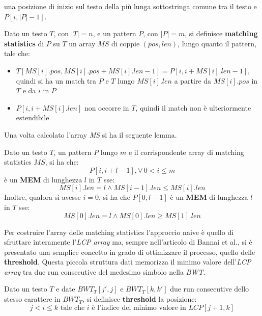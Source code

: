 una posizione di inizio sul testo della più lunga sottostringa comune tra il
testo e $P[i, |P|-1]$. 
\begin{definizione}
  Dato un testo $T$, con $|T|=n$, e un pattern $P$, con $|P|=m$, si definisce
  \textbf{matching statistics} di $P$ su $T$ un array $MS$ di coppie $(pos,
  len)$, lungo quanto il pattern, tale che:
  \begin{itemize}
    \item $T[MS[i].pos,MS[i].pos+MS[i].len-1]=P[i,i+MS[i].len-1]$, quindi si ha
    un match tra $P$ e $T$ lungo $MS[i].len$ a partire da $MS[i].pos$ in $T$ e
    da $i$ in $P$
    \item $P[i,i+MS[i].len]$ non occorre in $T$, quindi il match non è
    ulteriormente estendibile 
  \end{itemize}
\end{definizione}
\noindent
Una volta calcolato l'array \textit{MS} si ha il seguente lemma.
\begin{lemma}
  Dato un testo $T$, un pattern $P$ lungo $m$ e il
  corrispondente array di matching statistics $MS$, si ha che:
  \begin{equation}
    \label{eq:rlbwt5}
    P[i,i+l-1],\forall\, 0<i\leq m
  \end{equation}
  è un \textbf{MEM} di lunghezza $l$ in $T$ sse:
  \begin{equation}
    \label{eq:rlbwt6}
    MS[i].len=l\land MS[i-1].len\leq MS[i].len
  \end{equation}
  Inoltre, qualora si avesse $i=0$, si ha che $P[0,l-1]$ è un \textbf{MEM} di
  lunghezza $l$ in $T$ sse:
  \begin{equation}
    \label{eq:rlbwt7}
    MS[0].len=l\land MS[0].len\geq MS[1].len
  \end{equation}
\end{lemma}
Per costruire l'array delle matching statistics l'approccio naive è quello di
sfruttare 
interamente l'\textit{LCP array} ma, sempre nell'articolo di Bannai et
al.\cite{bannai}, si è presentato una semplice concetto in grado di
ottimizzare il processo, quello delle \textbf{threshold}. Questa piccola
struttura dati memorizza il minimo valore dell'\textit{LCP array} tra due run
consecutive del medesimo simbolo nella \textit{BWT}.
\begin{definizione}
  Dato un testo $T$ e date $BWT_T[j',j]$ e $BWT_T[k,k']$ due run consecutive
  dello stesso carattere in $BWT_T$, si definisce \textbf{threshold} la
  posizione:
  \begin{equation}
    \label{eq:rlbwt8}
    j< i \leq k\mbox{ tale che } i\mbox{ è l'indice del minimo valore in
    }LCP[j+1,k] 
  \end{equation}
\end{definizione}
